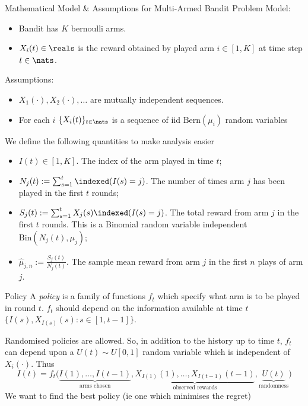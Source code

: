 \documentclass[11pt,a4paper]{article}
\begin{document}
\begin{proposition}{Mathematical Model \& Assumptions for Multi-Armed Bandit Problem}
  Model:
  \begin{itemize}
    \item Bandit has $K$ bernoulli arms.
    \item $X_i(t)\in\reals$ is the reward obtained by played arm $i\in[1,K]$ at time step $t\in\nats$.
  \end{itemize}
  Assumptions:
  \begin{itemize}
    \item $X_1(\cdot),X_2(\cdot),\dots$ are mutually independent sequences.
    \item For each $i$ $\{X_i(t)\}_{t\in\nats}$ is a sequence of iid $\text{Bern}(\mu_i)$ random variables
  \end{itemize}
  We define the following quantities to make analysis easier
  \begin{itemize}
    \item $I(t)\in[1,K]$. The index of the arm played in time $t$;
    \item $N_j(t):=\sum_{s=1}^t\indexed(I(s)=j)$. The number of times arm $j$ has been played in the first $t$ rounds;
    \item $S_j(t):=\sum_{s=1}^tX_j(s)\indexed(I(s)=j)$. The total reward from arm $j$ in the first $t$ rounds. This is a Binomial random variable independent $\text{Bin}(N_j(t),\mu_j)$;
    \item $\hat\mu_{j,n}:=\frac{S_j(t)}{N_j(t)}$. The sample mean reward from arm $j$ in the first $n$ plays of arm $j$.
  \end{itemize}
\end{proposition}

\begin{definition}{Policy}
  A \textit{policy} is a family of functions $f_t$ which specify what arm is to be played in round $t$. $f_t$ should depend on the information available at time $t$ $\big\{I(s),X_{I(s)}(s):s\in[1,t-1]\big\}$.
  \par Randomised policies are allowed. So, in addition to the history up to time $t$, $f_t$ can depend upon a $U(t)\sim U[0,1]$ random variable which is independent of $X_i(\cdot)$. Thus
  \[ I(t)=f_t\big(\underbrace{I(1),\dots,I(t-1)}_\text{arms chosen},\underbrace{X_{I(1)}(1),\dots,X_{I(t-1)}(t-1)}_\text{observed rewards},\underbrace{U(t)}_\text{randomness}\big) \]
  We want to find the best policy (ie one which minimises the regret)
\end{definition}
\end{document}
